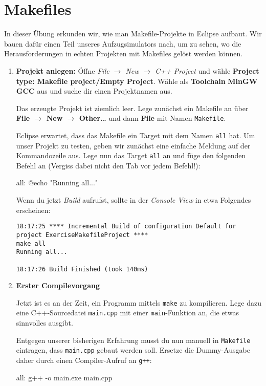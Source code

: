 \section{Makefiles}

In dieser Übung erkunden wir, wie man Makefile-Projekte in Eclipse aufbaut.
Wir bauen dafür einen Teil unseres Aufzugsimulators nach, um zu sehen, wo die Herausforderungen in echten Projekten mit Makefiles gelöst werden können.

\begin{enumerate}
\item\textbf{Projekt anlegen:}
Öffne \emph{File $\to$ New $\to$ C++ Project} und wähle \textbf{Project type: Makefile project/Empty Project}.
Wähle als \textbf{Toolchain} \textbf{MinGW GCC} aus und suche dir einen Projektnamen aus.

Das erzeugte Projekt ist ziemlich leer.
Lege zunächst ein Makefile an über \textbf{File $\to$ New $\to$ Other\dots} und dann \textbf{File} mit Namen \texttt{Makefile}.

Eclipse erwartet, dass das Makefile ein Target mit dem Namen \texttt{all} hat.
Um unser Projekt zu testen, geben wir zunächst eine einfache Meldung auf der Kommandozeile aus.
Lege nun das Target \texttt{all} an und füge den folgenden Befehl an (Vergiss dabei nicht den Tab vor jedem Befehl!):
\begin{lstmake}
all:
	@echo "Running all..."
\end{lstmake}

Wenn du jetzt \emph{Build} aufrufst, sollte in der \emph{Console View} in etwa Folgendes erscheinen:
\begin{verbatim}
18:17:25 **** Incremental Build of configuration Default for project ExerciseMakefileProject ****
make all
Running all...

18:17:26 Build Finished (took 140ms)
\end{verbatim}

\item\textbf{Erster Compilevorgang}

Jetzt ist es an der Zeit, ein Programm mittels \texttt{make} zu kompilieren.
Lege dazu eine C++-Sourcedatei \texttt{main.cpp} mit einer \texttt{main}-Funktion an, die etwas sinnvolles ausgibt.

Entgegen unserer bisherigen Erfahrung musst du nun manuell in \texttt{Makefile} eintragen, dass \texttt{main.cpp} gebaut werden soll.
Ersetze die Dummy-Ausgabe daher durch einen Compiler-Aufruf an \texttt{g++}:
\begin{lstmake}
all:
	g++ -o main.exe main.cpp
\end{lstmake}


\end{enumerate}
